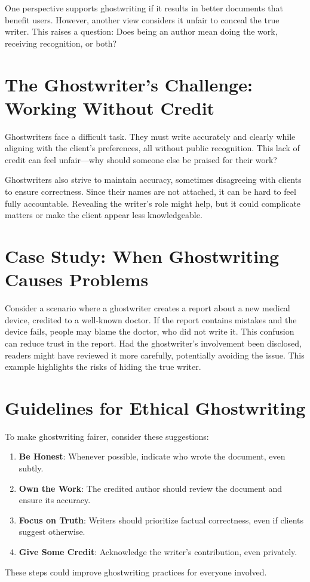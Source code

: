 \documentclass[a4paper,10pt,twocolumn]{memoir}
\begin{document}
One perspective supports ghostwriting if it results in better documents that benefit users. However, another view considers it unfair to conceal the true writer. This raises a question: Does being an author mean doing the work, receiving recognition, or both?


\section*{The Ghostwriter’s Challenge: Working Without Credit}
Ghostwriters face a difficult task. They must write accurately and clearly while aligning with the client’s preferences, all without public recognition. This lack of credit can feel unfair—why should someone else be praised for their work?

Ghostwriters also strive to maintain accuracy, sometimes disagreeing with clients to ensure correctness. Since their names are not attached, it can be hard to feel fully accountable. Revealing the writer’s role might help, but it could complicate matters or make the client appear less knowledgeable.

\section*{Case Study: When Ghostwriting Causes Problems}
Consider a scenario where a ghostwriter creates a report about a new medical device, credited to a well-known doctor. If the report contains mistakes and the device fails, people may blame the doctor, who did not write it. This confusion can reduce trust in the report. Had the ghostwriter’s involvement been disclosed, readers might have reviewed it more carefully, potentially avoiding the issue. This example highlights the risks of hiding the true writer.

\section*{Guidelines for Ethical Ghostwriting}
To make ghostwriting fairer, consider these suggestions:
\begin{enumerate}
    \item \textbf{Be Honest}: Whenever possible, indicate who wrote the document, even subtly.
    \item \textbf{Own the Work}: The credited author should review the document and ensure its accuracy.
    \item \textbf{Focus on Truth}: Writers should prioritize factual correctness, even if clients suggest otherwise.
    \item \textbf{Give Some Credit}: Acknowledge the writer’s contribution, even privately.
\end{enumerate}
These steps could improve ghostwriting practices for everyone involved.
\end{document}
